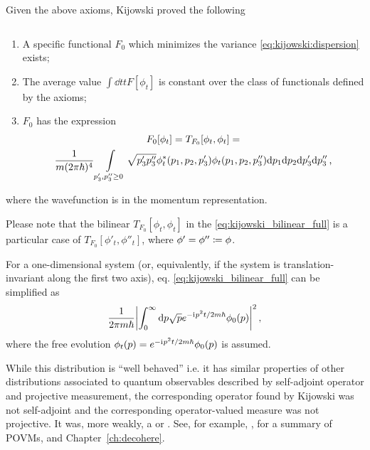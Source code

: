 Given the above axioms, Kijowski proved the following
\begin{theorem}
  $\,$

  \begin{enumerate}
    \item
      A specific functional $F_0$ which minimizes the variance
      \eqref{eq:kijowski:dispersion}
      exists;
    \item
      The average value $\int \dd{t} t F[\phi_t] $ is constant over the class of
      functionals defined by the axioms;
    \item
      $F_0$ has the expression
      \begin{multline}\label{eq:kijowski_bilinear_full}
        F_0[\phi_t] = T_{F_0}[\phi_t, \phi_t] = \\
            \frac{1}{m(2\pi\hbar)^4}
            \int\displaylimits_{p_{3}', p_{3}'' \ge 0} \sqrt{p_{3}' p_{3}''} \phi_t^{*}(p_1, p_2, p_{3}') \phi_t(p_1, p_2, p_{3}'')
            \dd p_1 \dd p_2 \dd p_{3}' \dd p_{3}''
                      \, \text{,}
      \end{multline}
  \end{enumerate}
  where the wavefunction is in the momentum representation.
\end{theorem}

Please note that the bilinear $T_{F_0}[\phi_t, \phi_t]$ in the \eqref{eq:kijowski_bilinear_full}
is a particular case of $T_{F_0}[\phi'_t, \phi''_t]$, where $\phi' = \phi'' \coloneqq \phi$.

For a one-dimensional system (or, equivalently, if the system is translation-invariant along the first two axis),
eq. \eqref{eq:kijowski_bilinear_full} can be simplified as
\begin{equation}  
  \frac{1}{2 \pi m \hbar} \abs{\int_0^{\infty} \dd p \sqrt{p} e^{-\mathrm{i}\mkern1mu p^{2} t / 2m\hbar} \phi_{0}(p)}^2
  \, \text{,}
\end{equation}
where the free evolution
$\phi_t(p) = e^{-\mathrm{i}\mkern1mu p^{2} t / 2m\hbar}\phi_{0}(p)$
is assumed.

While this distribution is ``well behaved'' i.e. it has similar properties of other distributions
associated to quantum observables described by self-adjoint operator and projective measurement,
the corresponding operator found by Kijowski was not self-adjoint and the corresponding
operator-valued measure was not projective.
It was, more weakly, a  or .
See, for example, \cite[]{TQM1},
for a summary of POVMs, and Chapter~\ref{ch:decohere}.

